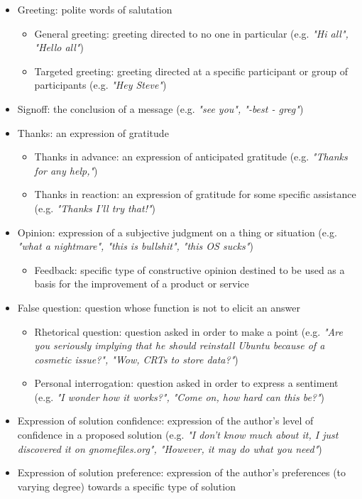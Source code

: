 \documentclass[11pt]{article}
\begin{document}
\begin{itemize}
	\item Greeting: polite words of salutation
		\begin{itemize}
			\item General greeting: greeting directed to no one in particular (e.g. \textit{"Hi all", "Hello all"})
			\item Targeted greeting: greeting directed at a specific participant or group of participants (e.g. \textit{"Hey Steve"})
		\end{itemize}
	\item Signoff: the conclusion of a message (e.g. \textit{"see you", "-best - greg"})
	\item Thanks: an expression of gratitude
		\begin{itemize}
			\item Thanks in advance: an expression of anticipated gratitude (e.g. \textit{"Thanks for any help,"})
			\item Thanks in reaction: an expression of gratitude for some specific assistance (e.g. \textit{"Thanks I'll try that!"})
		\end{itemize}
	\item Opinion: expression of a subjective judgment on a thing or situation (e.g. \textit{"what a nightmare", "this is bullshit", "this OS sucks"})
		\begin{itemize}
			\item Feedback: specific type of constructive opinion destined to be used as a basis for the improvement of a product or service
		\end{itemize}
	\item False question: question whose function is not to elicit an answer
		\begin{itemize}
			\item Rhetorical question: question asked in order to make a point (e.g. \textit{"Are you seriously implying that he should reinstall Ubuntu because of a cosmetic issue?", "Wow, CRTs to store data?"})
			\item Personal interrogation: question asked in order to express a sentiment (e.g. \textit{"I wonder how it works?", "Come on, how hard can this be?"})
		\end{itemize}
	\item Expression of solution confidence: expression of the author's level of confidence in a proposed solution (e.g. \textit{"I don't know much about it, I just discovered it on gnomefiles.org", "However, it may do what you need"})
	\item Expression of solution preference: expression of the author's preferences (to varying degree) towards a specific type of solution
\end{itemize}
\end{document}
